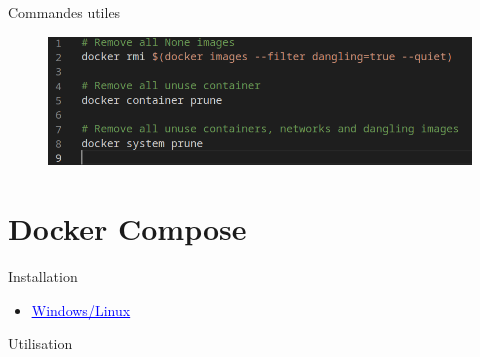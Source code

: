 \documentclass[11pt]{beamer}
\newcommand{\blue}[1]{\textcolor{blue}{#1}}
\begin{document}
\begin{frame}{Commandes utiles}
	\begin{figure}
		\includegraphics[scale=0.45]{images/commandes_pratiques.png}
	\end{figure}

\end{frame}

\section{Docker Compose}
\begin{frame}{Installation}
	\begin{itemize}
		\item \href{https://docs.docker.com/compose/install/}{\blue{\underline{Windows/Linux}}}
	\end{itemize}

\end{frame}

\begin{frame}{Utilisation}
	\centering
	
\end{frame}
\end{document}
